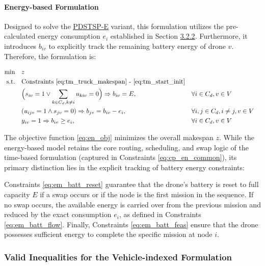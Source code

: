 \documentclass[3p, authoryear, 11pt]{elsarticle}
\begin{document}
\paragraph{Energy-based Formulation} 
Designed to solve the \hyperref[sec:energy_model_des]{PDSTSP-E} variant, this formulation utilizes the pre-calculated energy consumption $e_i$ established in Section \hyperref[sec:energy_model_des]{ 3.2.2}. Furthermore, it introduces $b_{iv}$ to explicitly track the remaining battery energy of drone $v$. Therefore, the formulation is:

\begin{align}
    \text{min} \quad & z \label{eq:en_obj} \\
    \text{s.t.} \quad 
    & \text{Constraints } \eqref{eq:tm_truck_makespan} \text{ - }\eqref{eq:tm_start_init} \label{eq:cp_en_common}\\
    & \Big(s_{iv} = 1 \lor \sum_{k \in C_d, k \neq i} u_{kiv} = 0\Big) \Rightarrow b_{iv} = E, && \forall i \in C_d, v \in V \label{eq:em_batt_reset} \\
    & (u_{ijv} = 1 \land s_{jv} = 0) \Rightarrow b_{jv} = b_{iv} - e_i, && \forall i, j \in C_d, i \neq j, v \in V \label{eq:em_batt_flow} \\
    & y_{iv} = 1 \Rightarrow b_{iv} \ge e_i, && \forall i \in C_d, v \in V \label{eq:em_batt_feas}
\end{align}
 

The objective function \eqref{eq:en_obj} minimizes the overall makespan $z$. While the energy-based model retains the core routing, scheduling, and swap logic of the time-based formulation (captured in Constraints \eqref{eq:cp_en_common}), its primary distinction lies in the explicit tracking of battery energy constraints:

Constraints \eqref{eq:em_batt_reset} guarantee that the drone's battery is reset to full capacity $E$ if a swap occurs or if the node is the first mission in the sequence. If no swap occurs, the available energy is carried over from the previous mission and reduced by the exact consumption $e_i$, as defined in Constraints \eqref{eq:em_batt_flow}. Finally, Constraints \eqref{eq:em_batt_feas} ensure that the drone possesses sufficient energy to complete the specific mission at node $i$.

\subsubsection{Valid Inequalities for the Vehicle-indexed Formulation}
\label{sec:cp_valid_ineq}
\end{document}
